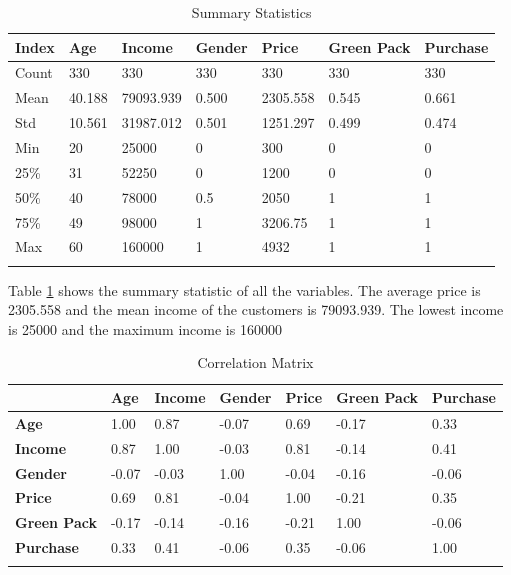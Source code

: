 \documentclass[a4paper,10pt]{article}
\begin{document}
\begin{table}[h]
\centering
\caption{Summary Statistics}
\begin{tabular}{|l|l|l|l|l|l|l|}
\hline
\textbf{Index} & \textbf{Age} & \textbf{Income} & \textbf{Gender} & \textbf{Price} & \textbf{Green Pack} & \textbf{Purchase} \\
\hline
Count & 330 & 330 & 330 & 330 & 330 & 330 \\
\hline
Mean & 40.188 & 79093.939 & 0.500 & 2305.558 & 0.545 & 0.661 \\
\hline
Std & 10.561 & 31987.012 & 0.501 & 1251.297 & 0.499 & 0.474 \\
\hline
Min & 20 & 25000 & 0 & 300 & 0 & 0 \\
\hline
25\% & 31 & 52250 & 0 & 1200 & 0 & 0 \\
\hline
50\% & 40 & 78000 & 0.5 & 2050 & 1 & 1 \\
\hline
75\% & 49 & 98000 & 1 & 3206.75 & 1 & 1 \\
\hline
Max & 60 & 160000 & 1 & 4932 & 1 & 1 \\
\hline
\label{summary_statistic}
\end{tabular}
\end{table}

Table \ref{summary_statistic} shows the summary statistic of all the variables. The average price is  2305.558 and the mean income of the customers is 79093.939. The lowest income is 25000 and the maximum income is 160000



\begin{table}[h]
\centering
\caption{Correlation Matrix}
\begin{tabular}{|l|l|l|l|l|l|l|}
\hline
 & \textbf{Age} & \textbf{Income} & \textbf{Gender} & \textbf{Price} & \textbf{Green Pack} & \textbf{Purchase} \\
\hline
\textbf{Age} & 1.00 & 0.87 & -0.07 & 0.69 & -0.17 & 0.33 \\
\hline
\textbf{Income} & 0.87 & 1.00 & -0.03 & 0.81 & -0.14 & 0.41 \\
\hline
\textbf{Gender} & -0.07 & -0.03 & 1.00 & -0.04 & -0.16 & -0.06 \\
\hline
\textbf{Price} & 0.69 & 0.81 & -0.04 & 1.00 & -0.21 & 0.35 \\
\hline
\textbf{Green Pack} & -0.17 & -0.14 & -0.16 & -0.21 & 1.00 & -0.06 \\
\hline
\textbf{Purchase} & 0.33 & 0.41 & -0.06 & 0.35 & -0.06 & 1.00 \\
\hline
\label{Correlation_matrix}
\end{tabular}
\end{table}
\end{document}

